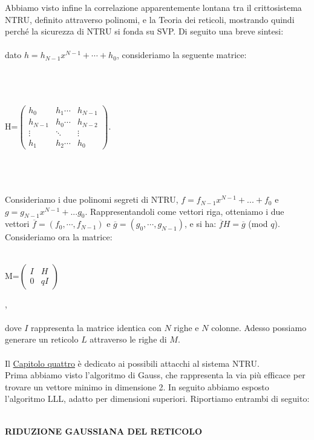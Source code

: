 \documentclass[a4paper,12pt]{report}
\theoremstyle{plain}
\theoremstyle{definition}
\theoremstyle{remark}
\begin{document}
Abbiamo visto infine la correlazione apparentemente lontana tra il crittosistema NTRU, definito attraverso polinomi, e la Teoria dei reticoli, mostrando quindi perch\'e la sicurezza di NTRU si fonda su SVP. Di seguito una breve sintesi:\\ \\ 
dato $h=h_{N-1}x^{N-1}+\cdots+h_0$, consideriamo la seguente matrice:
\\ \\ \\ \centerline {\nolinebreak \\
H=$
\left(\begin{matrix} h_0 & h_1 \cdots & h_{N-1} \\ 
h_{N-1} & h_0 \cdots & h_{N-2} \\ \vdots &
\ddots & \vdots \\ h_1 & h_2 \cdots &
h_0\end{matrix}\right )
$.}\\ \\ \\
Consideriamo i due polinomi segreti di NTRU, $f=f_{N-1}x^{N-1}+...+f_0$ e $g=g_{N-1}x^{N-1}+...g_0$. Rappresentandoli come vettori riga, otteniamo i due vettori $\overline{f}=(f_0,\cdots,f_{N-1})$ e $\overline{g}=(g_0,\cdots,g_{N-1})$, e si ha: $\overline{f}H=\overline{g}$ (mod $q$).\\
Consideriamo ora la matrice: \\ \\ \centerline{M=$
\left(\begin{matrix} I& H \\ 
0&
qI\end{matrix}\right )
$},\\ \\ dove $I$ rappresenta la matrice identica con $N$ righe e $N$ colonne. Adesso possiamo generare un reticolo $L$ attraverso le righe di $M$.
\\ \\
Il \underline{Capitolo quattro} \`e  dedicato ai possibili attacchi al sistema NTRU.\\Prima abbiamo visto l'algoritmo di Gauss, che rappresenta la via pi\` u efficace per trovare un vettore minimo in dimensione 2. In seguito abbiamo esposto l'algoritmo LLL, adatto per dimensioni superiori. Riportiamo entrambi di seguito:\\ \\ 

\centerline{\textbf{RIDUZIONE GAUSSIANA DEL RETICOLO}}
\end{document}
